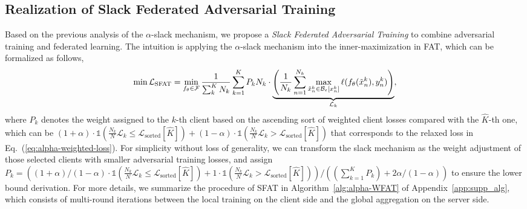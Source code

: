 \documentclass{article} %
\newcommand{\cF}{\mathcal{F}}
\newcommand{\bx}{{x}}
\newcommand{\epsball}{\mathcal{B}_\epsilon}
\newcommand{\xadv}{\tilde{{x}}}
\theoremstyle{plain}
\theoremstyle{definition}
\theoremstyle{remark}
\begin{document}
\subsection{Realization of Slack Federated Adversarial Training}
\label{sec:realization}

Based on the previous analysis of the $\alpha$-slack mechanism, we propose a \textit{Slack Federated Adversarial Training} to combine adversarial training and federated learning. The intuition is applying the $\alpha$-slack mechanism into the inner-maximization in FAT, which can be formalized as follows,
\begin{align}\label{eq:aWFAT}
\vspace{2mm}
\begin{split}
    \min \mathcal{L}_{\text{SFAT}} 
    =  \min_{f_{\theta}\in\cF} \frac{1}{\sum_{k}^K N_k} \sum_{k=1}^{K} P_k N_k \cdot \underbrace{\left( \frac{1}{N_k}\sum_{n=1}^{N_k} \max_{\xadv_n^{k}\in\epsball[\bx_n^{k}]} \ell(f_{\theta}(\xadv^{k}_n),y^{k}_n)\right)}_{\mathcal{L}_k},
\end{split}
\end{align}
\vspace{2mm}
where $P_k$ denotes the weight assigned to the $k$-th client based on the ascending sort of weighted client losses compared with the $\widehat{K}$-th one, which can be $(1+\alpha) \cdot \mathds{1}(\frac{N_k}{N}\mathcal{L}_k \leq \mathcal{L}_{\text{sorted}}[\widehat{K}]) + (1-\alpha) \cdot \mathds{1}(\frac{N_k}{N}\mathcal{L}_k > \mathcal{L}_{\text{sorted}}[\widehat{K}])$ that corresponds to the relaxed loss in Eq.~(\ref{eq:alpha-weighted-loss}). 
For simplicity without loss of generality, we can transform the slack mechanism as the weight adjustment of those selected clients with smaller adversarial training losses, and assign $P_k=((1+\alpha)/(1-\alpha) \cdot \mathds{1}(\frac{N_k}{N}\mathcal{L}_k \leq \mathcal{L}_{\text{sorted}}[\widehat{K}]) + 1 \cdot \mathds{1}(\frac{N_k}{N}\mathcal{L}_k > \mathcal{L}_{\text{sorted}}[\widehat{K}]))/((\sum_{k=1}^K P_k)+2\alpha/(1-\alpha))$ to ensure the lower bound derivation. 
For more details, we summarize the procedure of SFAT in Algorithm~\ref{alg:alpha-WFAT} of Appendix~\ref{app:supp_alg}, which consists of multi-round iterations between the local training on the client side and the global aggregation on the server side.

\end{document}
